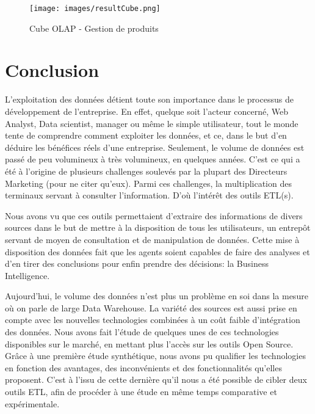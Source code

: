\documentclass[12pt,a4wide,twoside]{report}
\begin{document}
\begin{figure}[!h]
\begin{center}
			\texttt{[image: images/resultCube.png]}
\end{center}
\caption{Cube OLAP - Gestion de produits}
\end{figure}



\chapter*{Conclusion}
L'exploitation des données détient toute son importance dans le processus de développement de l'entreprise. En effet, quelque soit l'acteur concerné, Web Analyst, Data scientist, manager ou même le simple utilisateur, tout le monde tente de comprendre comment exploiter les données, et ce, dans le but d'en déduire les bénéfices réels d'une entreprise. Seulement, le volume de données est passé de peu volumineux à très volumineux, en quelques années. C'est ce qui a été à l'origine de plusieurs challenges soulevés par la plupart des Directeurs Marketing (pour ne citer qu'eux). Parmi ces challenges, la multiplication des terminaux servant à consulter l'information. D'où l'intérêt des outils ETL(s).


Nous avons vu que ces outils permettaient d'extraire des informations de divers sources dans le but de mettre à la disposition de tous les utilisateurs, un entrepôt servant de moyen de consultation et de manipulation de données. Cette mise à disposition des données fait que les agents soient capables de faire des analyses et d'en tirer des conclusions pour enfin prendre des décisions: la Business Intelligence.


Aujourd'hui, le volume des données n'est plus un problème en soi dans la mesure où on parle de large Data Warehouse. La variété des sources est aussi prise en compte avec les nouvelles technologies combinées à un coût faible d'intégration des données. Nous avons fait l'étude de quelques unes de ces technologies disponibles sur le marché, en mettant plus l'accès sur les outils Open Source. Grâce à une première étude synthétique, nous avons pu qualifier les technologies en fonction des avantages, des inconvénients et des fonctionnalités qu'elles proposent. C'est à l'issu de cette dernière qu'il nous a été possible de cibler deux outils ETL, afin de procéder à une étude en même temps comparative et expérimentale.
\end{document}
